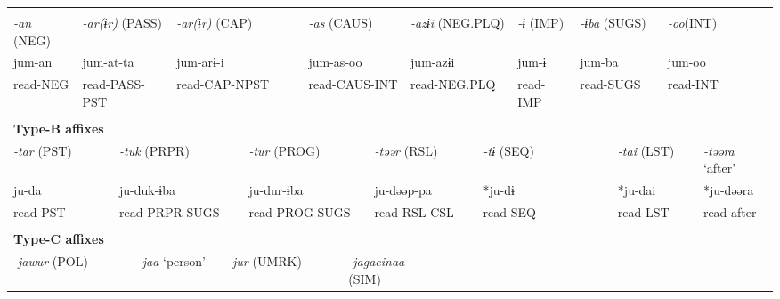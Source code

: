 \tabletail{}
\tablelasttail{}
\begin{tabularx}{\textwidth}{XXXXXXXXXXXXXXXXXXXXXXX}
\lsptoprule
\multicolumn{23}{X}{{\bfseries Type-A affixes}}\\
{ \textit{{}-an} (NEG)} & \multicolumn{4}{X}{{ \textit{{}-ar(ɨr)} (PASS)}} & \multicolumn{5}{X}{{ \textit{{}-ar(ɨr)} (CAP)}} & \multicolumn{4}{X}{{ \textit{{}-as} (CAUS)}} & \multicolumn{3}{X}{{ \textit{{}-azɨi} (NEG.PLQ)}} & { \textit{{}-ɨ} (IMP)} & \multicolumn{2}{X}{{ \textit{{}-ɨba} (SUGS)}} & \multicolumn{2}{X}{{ \textit{{}-oo}(INT)}} & \\
{ jum-an} & \multicolumn{4}{X}{{ jum-at-ta}} & \multicolumn{5}{X}{{ jum-arɨ-i}} & \multicolumn{4}{X}{{ jum-as-oo}} & \multicolumn{3}{X}{{ jum-azɨi}} & { jum-ɨ} & \multicolumn{2}{X}{{ jum-ba}} & \multicolumn{2}{X}{{ jum-oo}} & \\
read-NEG & \multicolumn{4}{X}{read-PASS-PST} & \multicolumn{5}{X}{read-CAP-NPST} & \multicolumn{4}{X}{read-CAUS-INT} & \multicolumn{3}{X}{read-NEG.PLQ} & read-IMP & \multicolumn{2}{X}{read-SUGS} & \multicolumn{2}{X}{read-INT} & \\
\multicolumn{23}{X}{}\\
\multicolumn{23}{X}{{\bfseries Type-B affixes}}\\
\multicolumn{3}{X}{{ \textit{{}-tar} (PST)}} & \multicolumn{5}{X}{{ \textit{{}-tuk} (PRPR)}} & \multicolumn{4}{X}{{ \textit{{}-tur} (PROG)}} & \multicolumn{4}{X}{{ \textit{{}-təər} (RSL)}} & \multicolumn{3}{X}{{ \textit{{}-tɨ} (SEQ)}} & \multicolumn{2}{X}{{ \textit{{}-tai} (LST)}} & \multicolumn{2}{X}{{ \textit{{}-təəra} ‘after’}}\\
\multicolumn{3}{X}{{ ju-da}} & \multicolumn{5}{X}{{ ju-duk-ɨba}} & \multicolumn{4}{X}{{ ju-dur-ɨba}} & \multicolumn{4}{X}{{ ju-dəəp-pa}} & \multicolumn{3}{X}{{ *ju-dɨ}} & \multicolumn{2}{X}{{ *ju-dai}} & \multicolumn{2}{X}{{ *ju-dəəra}}\\
\multicolumn{3}{X}{read-PST} & \multicolumn{5}{X}{read-PRPR-SUGS} & \multicolumn{4}{X}{read-PROG-SUGS} & \multicolumn{4}{X}{read-RSL-CSL} & \multicolumn{3}{X}{read-SEQ} & \multicolumn{2}{X}{read-LST} & \multicolumn{2}{X}{{ read-after}}\\
\multicolumn{3}{X}{} & \multicolumn{5}{X}{} & \multicolumn{4}{X}{} & \multicolumn{4}{X}{} & \multicolumn{3}{X}{} & \multicolumn{2}{X}{} & \multicolumn{2}{X}{}\\
\multicolumn{23}{X}{{\bfseries Type-C affixes}}\\
\multicolumn{4}{X}{{ \textit{{}-jawur} (POL)}} & \multicolumn{3}{X}{{ \textit{{}-jaa} ‘person’}} & \multicolumn{4}{X}{{ \textit{{}-jur} (UMRK)}} & \multicolumn{4}{X}{{ \textit{{}-jagacinaa} (SIM)}} & \multicolumn{8}{X}{}\\

\end{tabularx}
